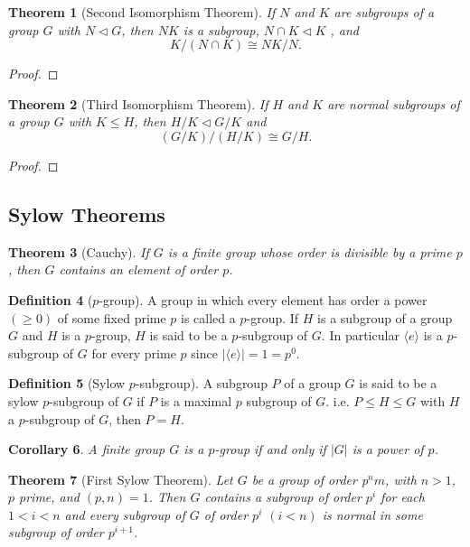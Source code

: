 \documentclass[leqno,DIV=calc,paper=a4,fontsize=11pt]{article}
\newtheorem{thm}{Theorem}[section]
\newtheorem{cor}[thm]{Corollary}
\theoremstyle{definition}
\newtheorem{defn}[thm]{Definition}
\theoremstyle{plain}
\theoremstyle{remark}
\begin{document}
\begin{thm}[Second Isomorphism Theorem]
If $N$ and $K$ are subgroups of a group $G$ with $N\lhd G$, then $NK$ is a subgroup, $N \cap K \lhd K$ , and
$$ K/(N \cap K)\cong NK/N.$$
\end{thm}
\begin{proof}

\end{proof}

\begin{thm}[Third Isomorphism Theorem]
If $H$ and $K$ are normal subgroups of a group $G$ with $K \leq H$, then $H/K \lhd G/K$ and
$$(G/K )/(H/K ) \cong G/H.$$
\end{thm}
\begin{proof}

\end{proof}
\subsection{Sylow Theorems}

\begin{thm}[Cauchy] If $G$ is a finite group whose order is divisible by a prime $p$, then $G$ contains an element of order $p$.
\end{thm}

\begin{defn}[$p$-group] A group in which every element has order a power $(\geq 0)$ of some fixed prime $p$ is called a $p$-group. If $H$ is a subgroup of a group $G$ and $H$ is a $p$-group, $H$ is said to be a $p$-subgroup of $G$. In particular $\langle e\rangle$ is a $p$-subgroup of $G$ for every prime $p$ since $|\langle e\rangle| = 1 = p^0$.
\end{defn}

\begin{defn}[Sylow $p$-subgroup] A subgroup $P$ of a group $G$ is said to be a sylow $p$-subgroup of $G$ if $P$ is a maximal $p$ subgroup of $G$. i.e. $P\leq H\leq G$ with $H$ a $p$-subgroup of $G$, then $P=H$.
\end{defn}

\begin{cor}
A finite group $G$ is a $p$-group if and only if $|G|$ is a power of $p$.
\end{cor}

\begin{thm}[First Sylow Theorem] Let $G$ be a group of order p$^nm$, with $n > 1$, $p$ prime, and $(p,n) = 1$. Then $G$ contains a subgroup of order $p^i$ for each $1 < i < n$ and every subgroup of $G$ of order $p^i$ $(i < n)$ is normal in some subgroup of order $p^{i+1}$.
\end{thm}
\end{document}
